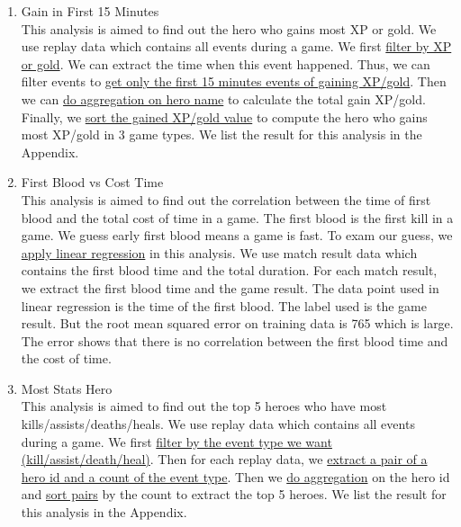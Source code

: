 \documentclass{article}
\begin{document}
\begin{enumerate}
    \item Gain in First 15 Minutes \\
    This analysis is aimed to find out the hero who gains most XP or gold. We use replay data which contains all events during a game. We first \href{https://github.com/Vopaaz/big-data-psg-lgd/blob/master/src/main/scala/First15minGain.scala#L44-L47}{filter by XP or gold}. We can extract the time when this event happened. Thus, we can filter events to \href{https://github.com/Vopaaz/big-data-psg-lgd/blob/master/src/main/scala/First15minGain.scala#L48-L50}{get only the first 15 minutes events of gaining XP/gold}. Then we can \href{https://github.com/Vopaaz/big-data-psg-lgd/blob/master/src/main/scala/First15minGain.scala#L81-L82}{do aggregation on hero name} to calculate the total gain XP/gold. Finally, we \href{https://github.com/Vopaaz/big-data-psg-lgd/blob/master/src/main/scala/First15minGain.scala#L89-L96}{sort the gained XP/gold value} to compute the hero who gains most XP/gold in 3 game types. We list the result for this analysis in the Appendix.
    \item First Blood vs Cost Time\\
    This analysis is aimed to find out the correlation between the time of first blood and the total cost of time in a game. The first blood is the first kill in a game. We guess early first blood means a game is fast. To exam our guess, we \href{https://github.com/Vopaaz/big-data-psg-lgd/blob/master/src/main/scala/FirstBloodTrain.scala#L31-L33}{apply linear regression} in this analysis. We use match result data which contains the first blood time and the total duration. For each match result, we extract the first blood time and the game result. The data point used in linear regression is the time of the first blood. The label used is the game result. But the root mean squared error on training data is 765 which is large. The error shows that there is no correlation between the first blood time and the cost of time.
    \item Most Stats Hero \\
    This analysis is aimed to find out the top 5 heroes who have most kills/assists/deaths/heals. We use replay data which contains all events during a game. We first \href{https://github.com/Vopaaz/big-data-psg-lgd/blob/master/src/main/scala/HeroMostStats.scala#L60}{filter by the event type we want (kill/assist/death/heal)}. Then for each replay data, we \href{https://github.com/Vopaaz/big-data-psg-lgd/blob/master/src/main/scala/HeroMostStats.scala#L61}{extract a pair of a hero id and a count of the event type}. Then we \href{https://github.com/Vopaaz/big-data-psg-lgd/blob/master/src/main/scala/HeroMostStats.scala#L62}{do aggregation} on the hero id and \href{https://github.com/Vopaaz/big-data-psg-lgd/blob/master/src/main/scala/HeroMostStats.scala#L65}{sort pairs} by the count to extract the top 5 heroes. We list the result for this analysis in the Appendix.

\end{enumerate}
\end{document}

